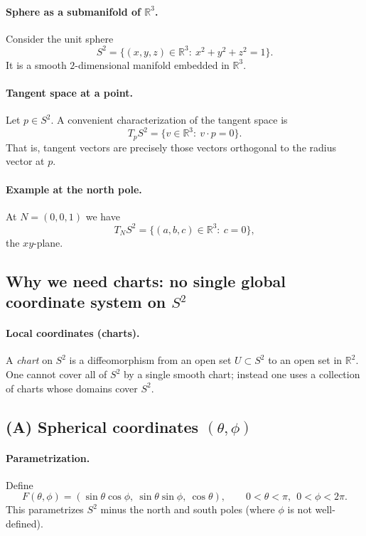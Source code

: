 \documentclass[12pt,a4paper]{article}
\theoremstyle{plain}
\theoremstyle{definition}      %
\begin{document}
	\paragraph{Sphere as a submanifold of $\mathbb{R}^3$.}
	Consider the unit sphere
	\[
	S^2=\{(x,y,z)\in\mathbb{R}^3:\ x^2+y^2+z^2=1\}.
	\]
	It is a smooth $2$-dimensional manifold embedded in $\mathbb{R}^3$.
	
	\paragraph{Tangent space at a point.}
	Let $p\in S^2$. A convenient characterization of the tangent space is
	\[
	T_pS^2=\{v\in\mathbb{R}^3:\ v\cdot p=0\}.
	\]
	That is, tangent vectors are precisely those vectors orthogonal to the radius vector at $p$.
	
	\paragraph{Example at the north pole.}
	At $N=(0,0,1)$ we have
	\[
	T_NS^2=\{(a,b,c)\in\mathbb{R}^3:\ c=0\},
	\]
	the $xy$-plane.
	
	\subsection*{Why we need charts: no single global coordinate system on $S^2$}
	
	\paragraph{Local coordinates (charts).}
	A \emph{chart} on $S^2$ is a diffeomorphism from an open set $U\subset S^2$ to an open set in $\mathbb{R}^2$.
	One cannot cover all of $S^2$ by a single smooth chart; instead one uses a collection of charts whose domains cover $S^2$.
	
	\subsection*{(A) Spherical coordinates $(\theta,\phi)$}
	
	\paragraph{Parametrization.}
	Define
	\[
	F(\theta,\phi)=(\sin\theta\cos\phi,\ \sin\theta\sin\phi,\ \cos\theta),
	\qquad 0<\theta<\pi,\ \ 0<\phi<2\pi.
	\]
	This parametrizes $S^2$ minus the north and south poles (where $\phi$ is not well-defined).
	
\end{document}
